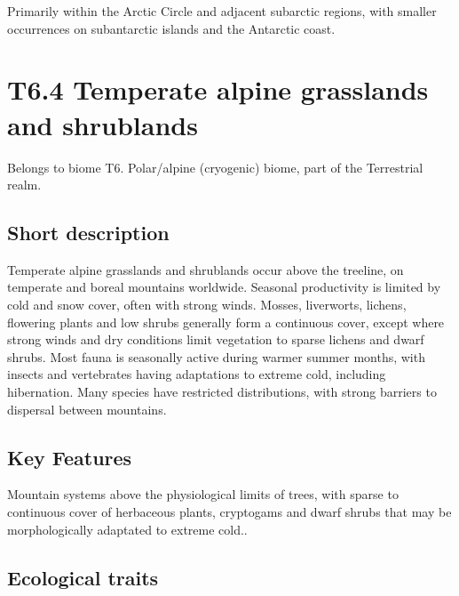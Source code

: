 \documentclass[
  letterpaper,
  DIV=11,
  numbers=noendperiod]{scrartcl}
\begin{document}
Primarily within the Arctic Circle and adjacent subarctic regions, with
smaller occurrences on subantarctic islands and the Antarctic coast.

\section{T6.4 Temperate alpine grasslands and
shrublands}\label{t6.4-temperate-alpine-grasslands-and-shrublands}

Belongs to biome T6. Polar/alpine (cryogenic) biome, part of the
Terrestrial realm.

\subsection{Short description}\label{short-description-96}

Temperate alpine grasslands and shrublands occur above the treeline, on
temperate and boreal mountains worldwide. Seasonal productivity is
limited by cold and snow cover, often with strong winds. Mosses,
liverworts, lichens, flowering plants and low shrubs generally form a
continuous cover, except where strong winds and dry conditions limit
vegetation to sparse lichens and dwarf shrubs. Most fauna is seasonally
active during warmer summer months, with insects and vertebrates having
adaptations to extreme cold, including hibernation. Many species have
restricted distributions, with strong barriers to dispersal between
mountains.

\subsection{Key Features}\label{key-features-96}

Mountain systems above the physiological limits of trees, with sparse to
continuous cover of herbaceous plants, cryptogams and dwarf shrubs that
may be morphologically adaptated to extreme cold..

\subsection{Ecological traits}\label{ecological-traits-96}
\end{document}
